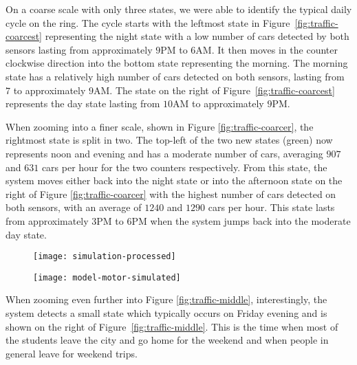 On a coarse scale with only three states, we were able to identify the typical daily cycle on the ring. The cycle starts with the leftmost state in Figure~\ref{fig:traffic-coarcest} representing the night state with a low number of cars detected by both sensors lasting from approximately $9$PM to $6$AM. It then moves in the counter clockwise direction into the bottom state representing the morning. The morning state has a relatively high number of cars detected on both sensors, lasting from $7$ to approximately $9$AM. The state on the right of Figure~\ref{fig:traffic-coarcest} represents the day state lasting from $10$AM to approximately $9$PM.

When zooming into a finer scale, shown in Figure \ref{fig:traffic-coarcer}, the rightmost state is split in two. The top-left of the two new states (green) now represents noon and evening and has a moderate number of cars, averaging $907$ and $631$ cars per hour for the two counters respectively. From this state, the system moves either back into the night state or into the afternoon state on the right of Figure \ref{fig:traffic-coarcer} with the highest number of cars detected on both sensors, with an average of $1240$ and $1290$ cars per hour. This state lasts from approximately $3$PM to $6$PM when the system jumps back into the moderate day state.


\begin{figure*}[h!]
  	\centering
  	\begin{subfigure}[b]{.48\textwidth}
	  	\centering
	  	\texttt{[image: simulation-processed]}
  		\caption{\label{fig:simulation-chart}}
	\end{subfigure}
  	\begin{subfigure}[b]{.48\textwidth}
	  	\centering
	  	\texttt{[image: model-motor-simulated]}
  		\caption{\label{fig:simulation-model}}
	\end{subfigure}
  	\caption{Simulation of an electric motor plotted as a standard time-chart \ref{fig:simulation-chart} and our qualitative model \ref{fig:simulation-model}.}
  	\label{fig:example-motor}
\end{figure*}

When zooming even further into Figure \ref{fig:traffic-middle}, interestingly, the system detects a small state which typically occurs on Friday evening and is shown on the right of Figure~\ref{fig:traffic-middle}. This is the time when most of the students leave the city and go home for the weekend and when people in general leave for weekend trips.

